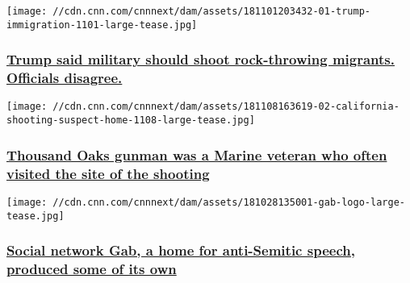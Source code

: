 \texttt{[image: //cdn.cnn.com/cnnnext/dam/assets/181101203432-01-trump-immigration-1101-large-tease.jpg]}

\hypertarget{trump-said-military-should-shoot-rock-throwing-migrants-officials-disagree}{%
\subsubsection{\texorpdfstring{\href{/2018/11/02/us/officials-dismiss-shooting-rock-throwing-migrants-trump-invs/index.html}{Trump
said military should shoot rock-throwing migrants. Officials
disagree.}}{Trump said military should shoot rock-throwing migrants. Officials disagree.}}\label{trump-said-military-should-shoot-rock-throwing-migrants-officials-disagree}}

\href{/2018/11/08/us/thousand-oaks-gunman/index.html}{}

\texttt{[image: //cdn.cnn.com/cnnnext/dam/assets/181108163619-02-california-shooting-suspect-home-1108-large-tease.jpg]}

\hypertarget{thousand-oaks-gunman-was-a-marine-veteran-who-often-visited-the-site-of-the-shooting}{%
\subsubsection{\texorpdfstring{\href{/2018/11/08/us/thousand-oaks-gunman/index.html}{Thousand
Oaks gunman was a Marine veteran who often visited the site of the
shooting}}{Thousand Oaks gunman was a Marine veteran who often visited the site of the shooting}}\label{thousand-oaks-gunman-was-a-marine-veteran-who-often-visited-the-site-of-the-shooting}}

\href{/2018/10/30/tech/gab-anti-semitic-speech-invs/index.html}{}

\texttt{[image: //cdn.cnn.com/cnnnext/dam/assets/181028135001-gab-logo-large-tease.jpg]}

\hypertarget{social-network-gab-a-home-for-anti-semitic-speech-produced-some-of-its-own}{%
\subsubsection{\texorpdfstring{\href{/2018/10/30/tech/gab-anti-semitic-speech-invs/index.html}{Social
network Gab, a home for anti-Semitic speech, produced some of its
own}}{Social network Gab, a home for anti-Semitic speech, produced some of its own}}\label{social-network-gab-a-home-for-anti-semitic-speech-produced-some-of-its-own}}

\href{/2018/10/26/politics/suspicious-packages-arrest/index.html}{}

